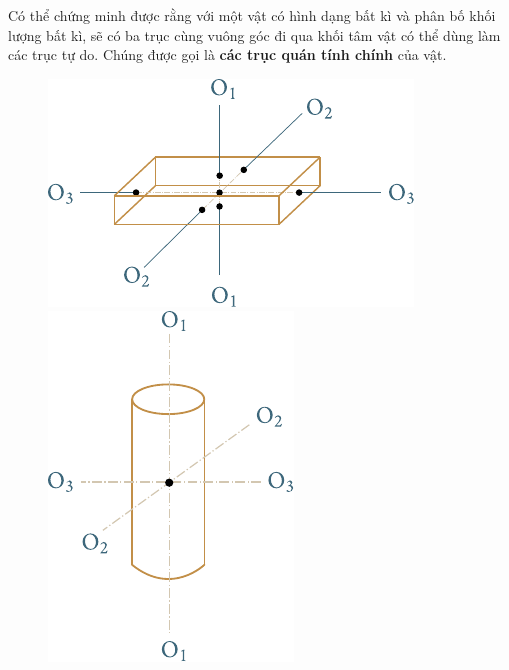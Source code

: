 Có thể chứng minh được rằng với một vật có hình dạng bất kì và phân bố khối lượng bất kì, sẽ có ba trục cùng vuông góc đi qua khối tâm vật có thể dùng làm các trục tự do. Chúng được gọi là \textbf{các trục quán tính chính} của vật.

\begin{figure}[!htb]
	\begin{minipage}[t]{0.5\linewidth}
		\begin{center}
			\includegraphics[scale=0.98]{figures/ch_05/fig_5_8.pdf}
			\caption[]{}
			\label{fig:5_8}
		\end{center}
	\end{minipage}
	\hspace{-0.05cm}
	\begin{minipage}[t]{0.5\linewidth}
		\begin{center}
			\includegraphics[scale=0.95]{figures/ch_05/fig_5_9.pdf}
			\caption[]{}
			\label{fig:5_9}
		\end{center}
	\end{minipage}
\end{figure}

